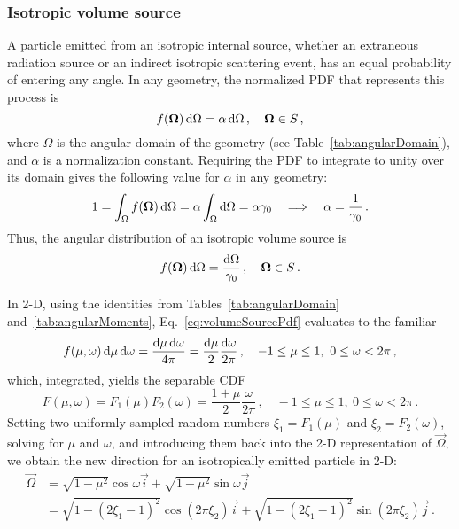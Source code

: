 \subsubsection{Isotropic volume source}
A particle emitted from an isotropic internal source, whether an extraneous
radiation source or an indirect isotropic scattering event, has an equal
probability of entering any angle. In any geometry, the normalized PDF that
represents this process is
\begin{equation*}
  f(\bm{\Omega}) \mathop{}\!\mathrm{d}\Omega = \alpha \mathop{}\!\mathrm{d}\Omega \,,
  \quad \bm{\Omega} \in S \,,
\end{equation*}
where $\Omega$ is the angular domain of the
geometry (see Table~\ref{tab:angularDomain}), and $\alpha$ is a normalization
constant.
Requiring the PDF to integrate to unity over its domain gives the
following value for $\alpha$ in any geometry:
\begin{align*}
  1 = \int_{\Omega} f(\bm{\Omega}) \mathop{}\!\mathrm{d}\Omega
  = \alpha \int_{\Omega} \mathop{}\!\mathrm{d}\Omega = \alpha \gamma_0
  \quad \Longrightarrow \quad
  \alpha = \frac{1}{\gamma_0}\,.
\end{align*}
Thus, the angular distribution of an isotropic volume source is
\begin{equation}\label{eq:volumeSourcePdf}
  f(\bm{\Omega}) \mathop{}\!\mathrm{d}\Omega = \frac{\mathop{}\!\mathrm{d}\Omega}{\gamma_0} \,,
  \quad \bm{\Omega} \in S\,.
\end{equation}

In 2-D, using the identities from Tables~\ref{tab:angularDomain}
and~\ref{tab:angularMoments}, Eq.~\eqref{eq:volumeSourcePdf} evaluates to the
familiar
\begin{equation*}
  f(\mu,\omega) \mathop{}\!\mathrm{d}\mu\mathop{}\!\mathrm{d}\omega = \frac{\mathop{}\!\mathrm{d}\mu\mathop{}\!\mathrm{d}\omega}{4\pi} 
  = \frac{\mathop{}\!\mathrm{d}\mu}{2}\frac{\mathop{}\!\mathrm{d}\omega}{2\pi}
  \,,
  \quad -1\le \mu \le 1,\ 0 \le \omega < 2\pi\,,
\end{equation*}
which, integrated, yields the separable CDF
\begin{equation*}
  F(\mu,\omega) = F_1(\mu) F_2(\omega)
  = \frac{1 + \mu}{2}\frac{\omega}{2\pi}\,,
  \quad -1\le \mu \le 1,\ 0 \le \omega < 2\pi\,.
\end{equation*}
Setting two uniformly sampled random numbers $\xi_1 = F_1(\mu)$ and
$\xi_2 = F_2(\omega)$, solving for $\mu$ and $\omega$, and
introducing them back into the 2-D representation of $\vec{\Omega}$, we obtain the
new direction for an isotropically emitted particle in 2-D:
\begin{align*}
  \vec{\Omega} &= \sqrt{1-\mu^2} \cos \omega \vec{i}
  + \sqrt{1-\mu^2} \sin \omega \vec{j}
\\
  &= \sqrt{1-(2\xi_1-1)^2} \cos(2\pi\xi_2) \vec{i}
  + \sqrt{1-(2\xi_1-1)^2} \sin(2\pi\xi_2) \vec{j}\,.
\end{align*}

